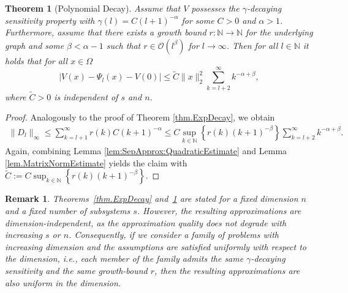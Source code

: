 \documentclass{article}
\def\N{\mathbb{N}}
\newtheorem{theorem}[lemma]{Theorem}
\newtheorem{remark}{Remark}[section]
\begin{document}
\begin{theorem}[Polynomial Decay]\label{thm.PolyDecay}
   Assume that $V$ possesses the $\gamma$-decaying sensitivity property with $\gamma(l) = C (l+1)^{-\alpha}$ for some $C > 0$ and $\alpha > 1$. Furthermore, assume that there exists a growth bound $r \colon \N \to \N$ for the underlying graph and some $\beta < \alpha - 1 $ such that $r \in \mathcal{O}(l^{\beta})$ for $l \to \infty$. Then for all $l \in \N$ it holds that for all $x \in \Omega$
    \begin{equation*}
        \lvert V(x) - \Psi_l(x) - V(0) \rvert \leq \widetilde{C} \lVert x \rVert_2^2 \sum_{k = l+2}^\infty k^{-\alpha + \beta}, 
    \end{equation*}
    where $\widetilde{C} > 0$ is independent of $s$ and $n$.  
\end{theorem}
\begin{proof}
Analogously to the proof of Theorem \ref{thm.ExpDecay}, we obtain 
\begin{align*}
    \lVert  D_l \rVert_\infty \leq  \sum_{k = l+1}^\infty r(k) C (k+1)^{- \alpha} 
    \leq C \sup_{k \in \N} \left\lbrace r(k) (k+1)^{-\beta}  \right\rbrace \sum_{k = l+2}^\infty k^{-\alpha + \beta}. 
\end{align*}
Again, combining Lemma \ref{lem:SepApprox:QuadraticEstimate} and Lemma \ref{lem.MatrixNormEstimate} yields the claim with \linebreak $\widetilde{C} := C \sup_{k \in \N} \left\lbrace r(k) (k+1)^{-\beta}  \right\rbrace$. 
\end{proof}

\begin{remark}
Theorems~\ref{thm.ExpDecay} and~\ref{thm.PolyDecay} are stated for a fixed dimension $n$ and a fixed number of subsystems $s$. However, the resulting approximations are dimension-independent, as the approximation quality does not degrade with increasing $s$ or $n$. Consequently, if we consider a family of problems with increasing dimension and the assumptions are satisfied uniformly with respect to the dimension, i.e., each member of the family admits the same $\gamma$-decaying sensitivity and the same growth-bound $r$, then the resulting approximations are also uniform in the dimension.\end{remark}
\end{document}
